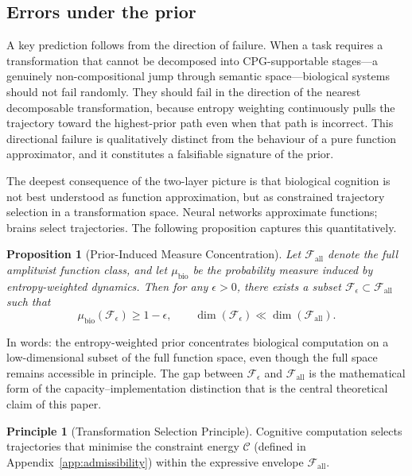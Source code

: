 \documentclass[12pt, a4paper]{article}
\newtheorem{proposition}[theorem]{Proposition}
\theoremstyle{remark}
\theoremstyle{definition}
\newtheorem{principle}[theorem]{Principle}
\begin{document}
\subsection{Errors under the prior}

A key prediction follows from the direction of failure.  When a task requires a
transformation that cannot be decomposed into CPG-supportable stages---a genuinely
non-compositional jump through semantic space---biological systems should not fail randomly.
They should fail in the direction of the nearest decomposable transformation, because
entropy weighting continuously pulls the trajectory toward the highest-prior path even when
that path is incorrect.  This directional failure is qualitatively distinct from the
behaviour of a pure function approximator, and it constitutes a falsifiable signature of
the prior.

The deepest consequence of the two-layer picture is that biological cognition is not best
understood as function approximation, but as constrained trajectory selection in a
transformation space.  Neural networks approximate functions; brains select trajectories.
The following proposition captures this quantitatively.

\begin{proposition}[Prior-Induced Measure Concentration]
\label{prop:concentration}
Let $\mathcal{F}_{\mathrm{all}}$ denote the full amplitwist function class, and let
$\mu_{\mathrm{bio}}$ be the probability measure induced by entropy-weighted dynamics.
Then for any $\epsilon > 0$, there exists a subset $\mathcal{F}_\epsilon \subset
\mathcal{F}_{\mathrm{all}}$ such that
\[
\mu_{\mathrm{bio}}(\mathcal{F}_\epsilon) \ge 1 - \epsilon,
\qquad
\dim(\mathcal{F}_\epsilon) \ll \dim(\mathcal{F}_{\mathrm{all}}).
\]
\end{proposition}

In words: the entropy-weighted prior concentrates biological computation on a
low-dimensional subset of the full function space, even though the full space remains
accessible in principle.  The gap between $\mathcal{F}_\epsilon$ and $\mathcal{F}_{\mathrm{all}}$
is the mathematical form of the capacity--implementation distinction that is the central
theoretical claim of this paper.

\begin{principle}[Transformation Selection Principle]
\label{prin:selection}
Cognitive computation selects trajectories that minimise the constraint energy $\mathcal{C}$
(defined in Appendix~\ref{app:admissibility}) within the expressive envelope
$\mathcal{F}_{\mathrm{all}}$.
\end{principle}
\end{document}
